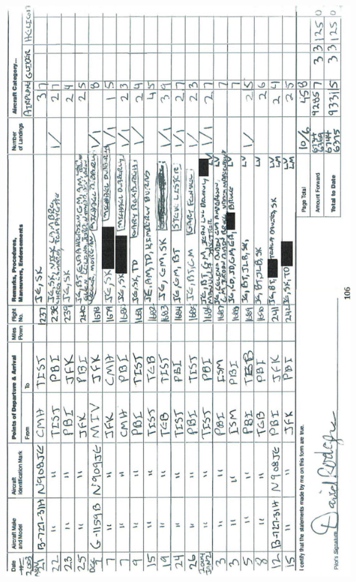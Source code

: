 \documentclass[10pt]{article}
\begin{document}
\includegraphics[max width=\textwidth, center]{2025_02_27_dd68c3d38de88f0516d9g-110}\\
\end{document}
